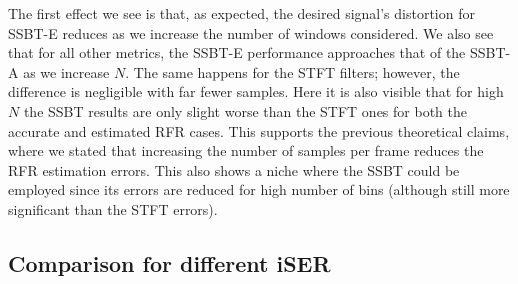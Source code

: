 The first effect we see is that, as expected, the desired signal's distortion for SSBT-E reduces as we increase the number of windows considered. We also see that for all other metrics, the SSBT-E performance approaches that of the SSBT-A as we increase $N$. The same happens for the STFT filters; however, the difference is negligible with far fewer samples. Here it is also visible that for high $N$ the SSBT results are only slight worse than the STFT ones for both the accurate and estimated RFR cases. This supports the previous theoretical claims, where we stated that increasing the number of samples per frame reduces the RFR estimation errors. This also shows a niche where the SSBT could be employed since its errors are reduced for high number of bins (although still more significant than the STFT errors).


\subsection{Comparison for different iSER}

